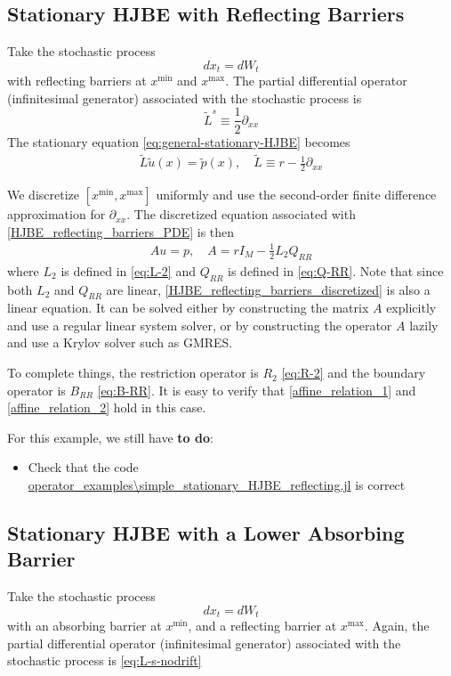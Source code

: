 \documentclass[11pt]{article}
\newcommand{\D}[1][]{\ensuremath{\partial_{#1}}}
\begin{document}
\subsection{Stationary HJBE with Reflecting Barriers}\label{sec:simple-reflecting-example}
Take the stochastic process
$$
d x_t = d W_t
$$
with reflecting barriers at $x^{\min}$ and $x^{\max}$.  The partial differential operator (infinitesimal generator) associated with the stochastic process is
\begin{equation}
	\tilde{L}^s \equiv \frac{1}{2}\D[xx]\label{eq:L-s-nodrift}
\end{equation}
The stationary equation \cref{eq:general-stationary-HJBE} becomes
\begin{align}
\tilde{L} \tilde{u}(x) = \tilde{p}(x),\quad\tilde{L}\equiv r - \frac{1}{2}\partial_{xx}\label{HJBE_reflecting_barriers_PDE}
\end{align}

We discretize $[x^{\min},x^{\max}]$ uniformly and use the second-order finite difference approximation for $\D[xx]$. The discretized equation associated with \cref{HJBE_reflecting_barriers_PDE} is then
\begin{align}
	Au = p,\quad A = rI_M - \frac{1}{2}L_2Q_{RR}\label{HJBE_reflecting_barriers_discretized}
\end{align}
where $L_2$ is defined in \cref{eq:L-2} and $Q_{RR}$ is defined in \cref{eq:Q-RR}. Note that since both $L_2$ and $Q_{RR}$ are linear, \cref{HJBE_reflecting_barriers_discretized} is also a linear equation. It can be solved either by constructing the matrix $A$ explicitly and use a regular linear system solver, or by constructing the operator $A$ lazily and use a Krylov solver such as GMRES.

To complete things, the restriction operator is $R_2$ \cref{eq:R-2} and the boundary operator is $B_{RR}$ \cref{eq:B-RR}. It is easy to verify that \cref{affine_relation_1} and \cref{affine_relation_2} hold in this case.

For this example, we still have \textbf{to do}:
\begin{itemize}
	\item Check that the code \url{operator_examples\simple_stationary_HJBE_reflecting.jl} is correct
\end{itemize}

\subsection{Stationary HJBE with a Lower Absorbing Barrier}
Take the stochastic process
$$
d x_t = d W_t
$$
with an absorbing barrier at $x^{\min}$, and a reflecting barrier at $x^{\max}$. Again, the partial differential operator (infinitesimal generator) associated with the stochastic process is \cref{eq:L-s-nodrift}
\end{document}
